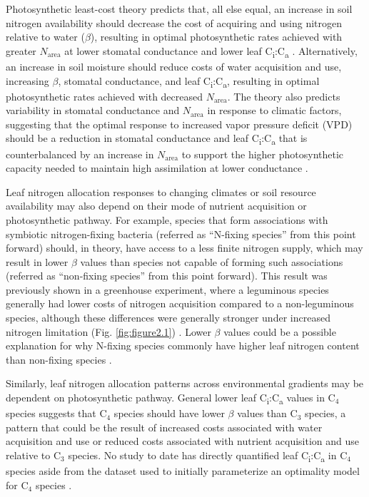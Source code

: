 Photosynthetic least-cost theory predicts that, all else equal, an increase in soil nitrogen availability should decrease the cost of acquiring and using nitrogen relative to water ($\beta$), resulting in optimal photosynthetic rates achieved with greater $N_\mathrm{area}$ at lower stomatal conductance and lower leaf C\textsubscript{i}:C\textsubscript{a} . Alternatively, an increase in soil moisture should reduce costs of water acquisition and use, increasing $\beta$, stomatal conductance, and leaf C\textsubscript{i}:C\textsubscript{a}, resulting in optimal photosynthetic rates achieved with decreased $N_\mathrm{area}$. The theory also predicts variability in stomatal conductance and $N_\mathrm{area}$ in response to climatic factors, suggesting that the optimal response to increased vapor pressure deficit (VPD) should be a reduction in stomatal conductance and leaf C\textsubscript{i}:C\textsubscript{a} that is counterbalanced by an increase in $N_\mathrm{area}$ to support the higher photosynthetic capacity needed to maintain high assimilation at lower conductance .

Leaf nitrogen allocation responses to changing climates or soil resource availability may also depend on their mode of nutrient acquisition or photosynthetic pathway. For example, species that form associations with symbiotic nitrogen-fixing bacteria (referred as “N-fixing species” from this point forward) should, in theory, have access to a less finite nitrogen supply, which may result in lower $\beta$ values than species not capable of forming such associations (referred as “non-fixing species” from this point forward). This result was previously shown in a greenhouse experiment, where a leguminous species generally had lower costs of nitrogen acquisition compared to a non-leguminous species, although these differences were generally stronger under increased nitrogen limitation (Fig. \ref{fig:figure2.1}) . Lower $\beta$ values could be a possible explanation for why N-fixing species commonly have higher leaf nitrogen content than non-fixing species . 

Similarly, leaf nitrogen allocation patterns across environmental gradients may be dependent on photosynthetic pathway. General lower leaf C\textsubscript{i}:C\textsubscript{a} values in C$_4$ species suggests that C$_4$ species should have lower $\beta$ values than C$_3$ species, a pattern that could be the result of increased costs associated with water acquisition and use or reduced costs associated with nutrient acquisition and use relative to C$_3$ species. No study to date has directly quantified leaf C\textsubscript{i}:C\textsubscript{a} in C$_4$ species aside from the dataset used to initially parameterize an optimality model for C$_4$ species .

